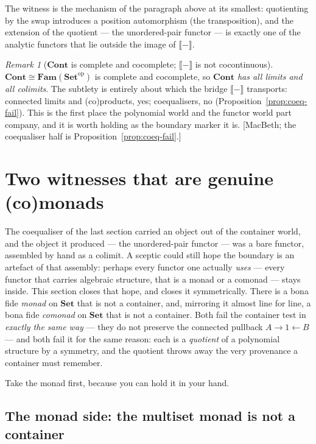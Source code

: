 \documentclass[11pt,a4paper]{book}
\newcommand{\Set}{\mathbf{Set}}
\newcommand{\Cont}{\mathbf{Cont}}
\newcommand{\Fam}{\mathbf{Fam}}
\newcommand{\op}{^{\mathrm{op}}}
\newcommand{\Ext}[1]{\llbracket #1 \rrbracket}
\theoremstyle{plain}
\theoremstyle{definition}
\theoremstyle{remark}
\newtheorem{Remark}[Theorem]{Remark}
\newcommand{\prov}[1]{\hfill\textsf{\footnotesize[#1]}}
\begin{document}
The witness is the mechanism of the paragraph above at its smallest: quotienting by
the swap introduces a position automorphism (the transposition), and the extension of
the quotient --- the unordered-pair functor --- is exactly one of the analytic
functors that lie outside the image of $\Ext{-}$.

\begin{Remark}[$\Cont$ is complete and cocomplete; $\Ext{-}$ is not cocontinuous]
$\Cont\cong\Fam(\Set\op)$ is complete and cocomplete, so \emph{$\Cont$ has all
limits and all colimits}. The subtlety is entirely about which the bridge $\Ext{-}$
transports: connected limits and (co)products, yes; coequalisers, no
(Proposition~\ref{prop:coeq-fail}). This is the first place the polynomial world and
the functor world part company, and it is worth holding as the boundary marker it is.
\prov{MacBeth; the coequaliser half is Proposition~\ref{prop:coeq-fail}.}
\end{Remark}

\section{Two witnesses that are genuine (co)monads}
\label{sec:two-witnesses}

The coequaliser of the last section carried an object out of the container world, and
the object it produced --- the unordered-pair functor --- was a bare functor, assembled
by hand as a colimit. A sceptic could still hope the boundary is an artefact of that
assembly: perhaps every functor one actually \emph{uses} --- every functor that carries
algebraic structure, that is a monad or a comonad --- stays inside. This section closes
that hope, and closes it symmetrically. There is a bona fide \emph{monad} on $\Set$ that
is not a container, and, mirroring it almost line for line, a bona fide \emph{comonad} on
$\Set$ that is not a container. Both fail the container test in \emph{exactly the same
way} --- they do not preserve the connected pullback $A\to 1\leftarrow B$ --- and both
fail it for the same reason: each is a \emph{quotient} of a polynomial structure by a
symmetry, and the quotient throws away the very provenance a container must remember.

Take the monad first, because you can hold it in your hand.

\subsection*{The monad side: the multiset monad is not a container}
\end{document}
